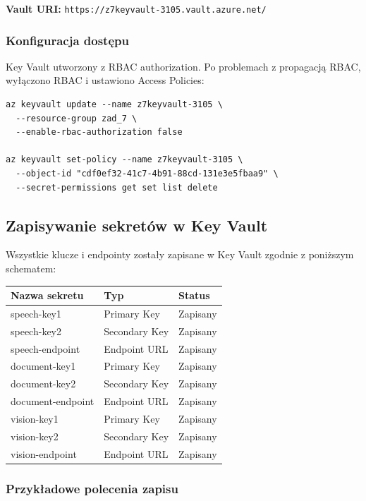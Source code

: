 \documentclass[twoside]{article}
\begin{document}
\textbf{Vault URI:} \texttt{https://z7keyvault-3105.vault.azure.net/}

\subsubsection{Konfiguracja dostępu}
Key Vault utworzony z RBAC authorization. Po problemach z propagacją RBAC, wyłączono RBAC i ustawiono Access Policies:

\begin{verbatim}
az keyvault update --name z7keyvault-3105 \
  --resource-group zad_7 \
  --enable-rbac-authorization false

az keyvault set-policy --name z7keyvault-3105 \
  --object-id "cdf0ef32-41c7-4b91-88cd-131e3e5fbaa9" \
  --secret-permissions get set list delete
\end{verbatim}

\subsection{Zapisywanie sekretów w Key Vault}

Wszystkie klucze i endpointy zostały zapisane w Key Vault zgodnie z poniższym schematem:

\begin{center}
	\begin{tabular}{|l|l|l|}
		\hline
		\textbf{Nazwa sekretu} & \textbf{Typ} & \textbf{Status} \\
		\hline
		speech-key1 & Primary Key & Zapisany \\
		speech-key2 & Secondary Key & Zapisany \\
		speech-endpoint & Endpoint URL & Zapisany \\
		\hline
		document-key1 & Primary Key & Zapisany \\
		document-key2 & Secondary Key & Zapisany \\
		document-endpoint & Endpoint URL & Zapisany \\
		\hline
		vision-key1 & Primary Key & Zapisany \\
		vision-key2 & Secondary Key & Zapisany \\
		vision-endpoint & Endpoint URL & Zapisany \\
		\hline
	\end{tabular}
\end{center}

\subsubsection{Przykładowe polecenia zapisu}
\end{document}

